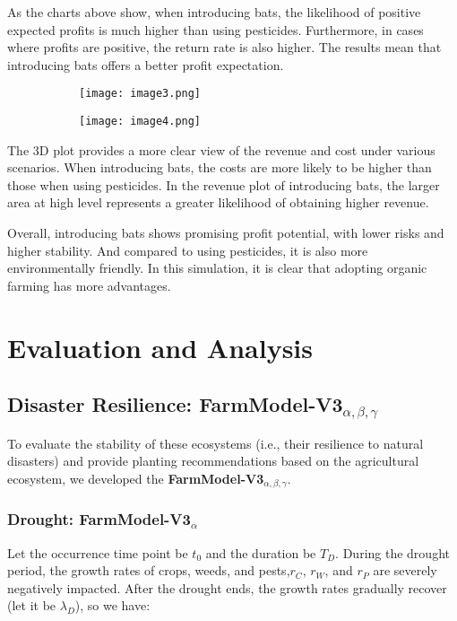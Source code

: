 \documentclass[12pt]{article}  %
\begin{document}
    As the charts above show, when introducing bats, the likelihood of positive expected profits is much higher than using pesticides. Furthermore, in cases where profits are positive, the return rate is also higher. The results mean that introducing bats offers a better profit expectation.
    \begin{figure}[h]
        \centering
        \begin{subfigure}[b]{.4\textwidth}
            \texttt{[image: image3.png]}
        \end{subfigure}
        \begin{subfigure}[b]{.4\textwidth}
            \texttt{[image: image4.png]}
        \end{subfigure}
    \end{figure}

    The 3D plot provides a more clear view of the revenue and cost under various scenarios. When introducing bats, the costs are more likely to be higher than those when using pesticides. In the revenue plot of introducing bats, the larger area at high level represents a greater likelihood of obtaining higher revenue.

    Overall, introducing bats shows promising profit potential, with lower risks and higher stability. And compared to using pesticides, it is also more environmentally friendly. In this simulation, it is clear that adopting organic farming has more advantages.




\section{Evaluation and Analysis}

\subsection{Disaster Resilience: FarmModel-V3$_{\alpha,\beta,\gamma}$}
To evaluate the stability of these ecosystems (i.e., 
their resilience to natural disasters) and provide planting 
recommendations based on the agricultural ecosystem, 
we developed the \textbf{FarmModel-V3$_{\alpha,\beta,\gamma}$}.

\subsubsection{Drought: FarmModel-V3$_{\alpha}$}
Let the occurrence time point be $t_0$ and the duration be $T_D$.
During the drought period, the growth rates of crops, 
weeds, and pests,$r_C$, $r_W$, and $r_P$ are severely negatively impacted. 
After the drought ends, the growth rates gradually recover (let it be $\lambda_D$), so we have:
\end{document}
